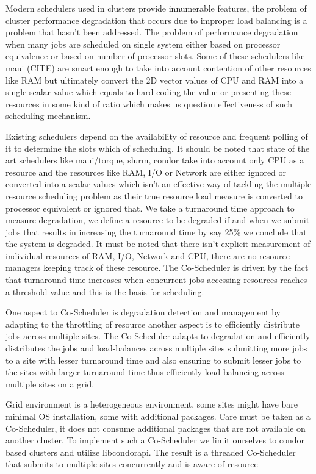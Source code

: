 \documentclass[ms,electronic,double]{nuthesis}
\begin{document}
Modern schedulers used in clusters provide innumerable features, the problem of cluster 
performance degradation that occurs due to improper load balancing is a problem that hasn't been 
addressed. The problem of performance degradation when many jobs are scheduled on single system 
either based on processor equivalence or based on number of processor slots. Some of 
these schedulers like maui (CITE) are smart enough to take into account contention of other 
resources like RAM but ultimately convert the 2D vector values of CPU and RAM 
into a single scalar value which equals to hard-coding the value or presenting these resources
in some kind of ratio which makes us question effectiveness of such scheduling mechanism. 

Existing schedulers depend on the availability of resource and frequent polling 
of it to determine the slots which of scheduling. It should be noted that state of the art 
schedulers like maui/torque, slurm, condor take into account only CPU as a 
resource and the resources like RAM, I/O or Network are either ignored or 
converted into a scalar values which isn't an effective way of tackling the multiple resource scheduling 
problem as their true resource load measure is converted to processor equivalent or ignored that. 
We take a turnaround time approach to measure degradation, we define a resource 
to be degraded if and when we submit jobs that results in increasing the 
turnaround time by say 25\% we conclude that the system is degraded. It must be 
noted that there isn't explicit measurement of individual resources of RAM, I/O, 
Network and CPU, there are no resource managers keeping track of these resource. 
The Co-Scheduler is driven by the fact that turnaround time increases when 
concurrent jobs accessing resources reaches a threshold value and this is the 
basis for scheduling.

One aspect to Co-Scheduler is degradation detection and management by adapting 
to the throttling of resource another aspect is to efficiently distribute jobs 
across multiple sites. The Co-Scheduler adapts to degradation and efficiently 
distributes the jobs and load-balances across multiple sites submitting more 
jobs to a site with lesser turnaround time and also ensuring to submit lesser 
jobs to the sites with larger turnaround time thus efficiently load-balancing 
across multiple sites on a grid.

Grid environment is a heterogeneous environment, some sites might have bare 
minimal OS installation, some with additional packages. Care must be taken as a 
Co-Scheduler, it does not consume additional packages that are not available on 
another cluster. To implement such a Co-Scheduler we limit ourselves to condor 
based clusters and utilize libcondorapi. The result is a threaded Co-Scheduler 
that submits to multiple sites concurrently and is aware of resource 
\end{document}
